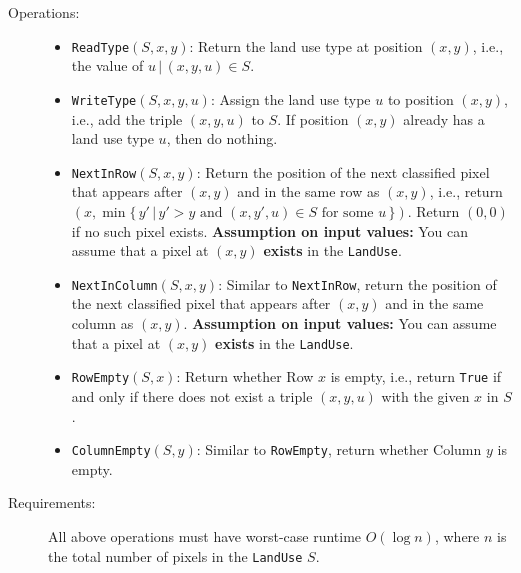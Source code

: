 \documentclass{assignment-263}
\begin{document}
\begin{enumerate}
\begin{description}
		\item[Operations:]\mbox{}
			\begin{itemize}
			\item	\texttt{ReadType}$(S, x, y)$: Return the land use type
					at position $(x, y)$, i.e., the value of
					$u \, \vert \, (x, y, u)\in S$. 
			\item	\texttt{WriteType}$(S, x, y, u)$: Assign the land use type
					$u$ to position $(x, y)$, i.e., add the
					triple $(x, y, u)$ to $S$. If position $(x, y)$
					already has a land use type $u$, then do nothing.
			\item	\texttt{NextInRow}$(S, x, y)$: Return the position of the
				next classified pixel that appears after $(x, y)$ and in the
				same row as $(x, y)$, i.e., return $(x, \min\{\,y' \, \vert \, y' > y
				\text{ and } (x, y', u)\in S \text{ for some } u\,\})$.
				Return $(0, 0)$ if no such pixel exists.
				\textbf{Assumption on input values:} You can assume that a
				pixel at $(x, y)$ \textbf{exists} in the \texttt{LandUse}.
			\item	\texttt{NextInColumn}$(S, x, y)$: Similar to
				\texttt{NextInRow}, return the position of the next classified
				pixel that appears after $(x, y)$ and in the same column as
				$(x, y)$.  \textbf{Assumption on input values:} You can
				assume that a pixel at $(x, y)$ \textbf{exists} in the
				\texttt{LandUse}.
 
			\item	\texttt{RowEmpty}$(S, x)$: Return whether Row $x$ is
					empty, i.e., return \texttt{True} if and only
					if there does not exist a triple $(x, y, u)$ with
					the given $x$ in $S$.
			\item	\texttt{ColumnEmpty}$(S, y)$: Similar to
					\texttt{RowEmpty}, return whether Column $y$ is empty.
			\end{itemize}

		\item[Requirements:]
				All above operations must have worst-case runtime
				$O(\log n)$, where $n$ is the total number of
				pixels in the \texttt{LandUse} $S$.
		\end{description}


\end{enumerate}
\end{document}
